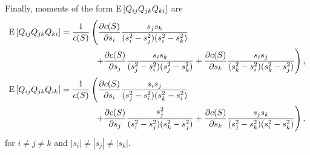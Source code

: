 Finally, moments of the form $\mathrm{E}\left[ Q_{ij}Q_{jk}Q_{ki} \right]$ are
\begin{subequations}
	\begin{align}
		\mathrm{E}\left[ Q_{ij}Q_{jk}Q_{ki} \right] &= \frac{1}{c(S)}\left( \frac{\partial c(S)}{\partial s_i} \frac{s_js_k}{(s_i^2-s_j^2)(s_i^2-s_k^2)} \right. \nonumber \\
		&\qquad\qquad \left. + \frac{\partial c(S)}{\partial s_j} \frac{s_is_k}{(s_j^2-s_i^2)(s_j^2-s_k^2)} + \frac{\partial c(S)}{\partial s_k} \frac{s_is_j}{(s_k^2-s_i^2)(s_k^2-s_j^2)} \right), \\
		\mathrm{E}\left[ Q_{ij}Q_{jk}Q_{ik} \right] &= \frac{1}{c(S)}\left( \frac{\partial c(S)}{\partial s_i} \frac{s_is_j}{(s_j^2-s_i^2)(s_k^2-s_i^2)} \right. \nonumber \\
		&\qquad\qquad \left. + \frac{\partial c(S)}{\partial s_j} \frac{s_j^2}{(s_i^2-s_j^2)(s_k^2-s_j^2)} + \frac{\partial c(S)}{\partial s_k} \frac{s_js_k}{(s_j^2-s_k^2)(s_i^2-s_k^2)} \right),
	\end{align}
\end{subequations}
for $i\neq j\neq k$ and $|s_i|\neq |s_j| \neq |s_k|$.



